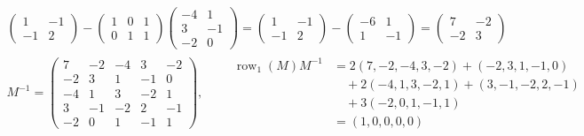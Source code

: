 \documentclass[12pt]{article}
\theoremstyle{definition}
\DeclareMathOperator{\row}{row}
\begin{document}
\begin{board}[The upper left block \(A^{-1}+A^{-1}BS^{-1}CA^{-1}=A^{-1}-(A^{-1}B)(-S^{-1}CA^{-1})\); \(M^{-1}\)
(Corollary~\ref{b5.10}); a check of row \(1\):]
\[
\begin{gathered}
\begin{pmatrix}1&-1\\-1&2\end{pmatrix}
-\begin{pmatrix}1&0&1\\0&1&1\end{pmatrix}\begin{pmatrix}-4&1\\3&-1\\-2&0\end{pmatrix}
=\begin{pmatrix}1&-1\\-1&2\end{pmatrix}-\begin{pmatrix}-6&1\\1&-1\end{pmatrix}=\begin{pmatrix}7&-2\\-2&3\end{pmatrix}\\
M^{-1}=\left(\begin{array}{cc|ccc}7&-2&-4&3&-2\\-2&3&1&-1&0\\\hline-4&1&3&-2&1\\3&-1&-2&2&-1\\-2&0&1&-1&1\end{array}\right),\qquad
\begin{aligned}\row_1(M)M^{-1}&=2(7,-2,-4,3,-2)+(-2,3,1,-1,0)\\&\quad+2(-4,1,3,-2,1)+(3,-1,-2,2,-1)\\
&\quad+3(-2,0,1,-1,1)\\&=(1,0,0,0,0)\end{aligned}
\end{gathered}
\]
\end{board}
\end{document}
